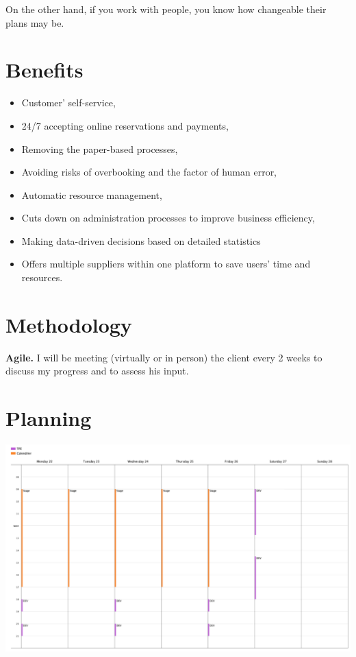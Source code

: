 \documentclass{article}
\begin{document}
        \vspace{0.3cm}
     
        On the other hand, if you work with people, you know how changeable their plans may be.

\section{Benefits}

  \begin{itemize}
  
	    \item Customer’ self-service,
	    \item 24/7 accepting online reservations and payments,
	    \item Removing the paper-based processes,
	    \item Avoiding risks of overbooking and the factor of          human error,
	    \item Automatic resource management,
	    \item Cuts down on administration processes to improve         business efficiency,
	    \item Making data-driven decisions based on detailed           statistics
	   \item Offers multiple suppliers within one platform to           save users’ time and resources.
	   
	 \end{itemize}

    
\section{Methodology}

    \textbf{Agile.} I will be meeting (virtually or in person) the client every 2 weeks to discuss my progress and to assess his input. 

\section{Planning}

    \includegraphics[width=1.2\textwidth]{planning.PNG}~\\[0.2cm]
\end{document}

